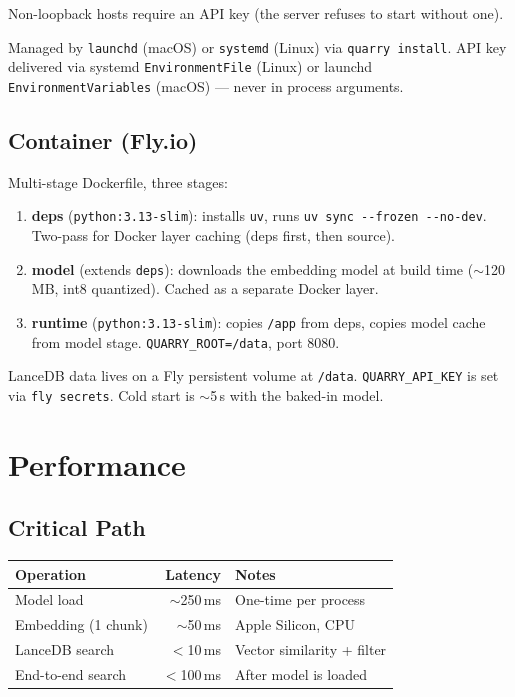 \documentclass[a4paper,10pt]{article}
\begin{document}
Non-loopback hosts require an API key (the server refuses to start
without one).

Managed by \texttt{launchd} (macOS) or \texttt{systemd} (Linux) via
\texttt{quarry install}.  API key delivered via systemd
\texttt{EnvironmentFile} (Linux) or launchd
\texttt{EnvironmentVariables} (macOS) --- never in process arguments.

\subsection{Container (Fly.io)}

Multi-stage Dockerfile, three stages:

\begin{enumerate}
  \item \textbf{deps} (\texttt{python:3.13-slim}): installs
    \texttt{uv}, runs \texttt{uv sync -{}-frozen -{}-no-dev}.  Two-pass
    for Docker layer caching (deps first, then source).
  \item \textbf{model} (extends \texttt{deps}): downloads the
    embedding model at build time ($\sim$120\,MB, int8 quantized).
    Cached as a separate Docker layer.
  \item \textbf{runtime} (\texttt{python:3.13-slim}): copies
    \texttt{/app} from deps, copies model cache from model stage.
    \texttt{QUARRY\_ROOT=/data}, port 8080.
\end{enumerate}

LanceDB data lives on a Fly persistent volume at \texttt{/data}.
\texttt{QUARRY\_API\_KEY} is set via \texttt{fly secrets}.
Cold start is $\sim$5\,s with the baked-in model.

\section{Performance}

\subsection{Critical Path}

\begin{center}
\begin{tabular}{lrl}
\toprule
\textbf{Operation} & \textbf{Latency} & \textbf{Notes} \\
\midrule
Model load         & $\sim$250\,ms & One-time per process \\
Embedding (1 chunk) & $\sim$50\,ms  & Apple Silicon, CPU \\
LanceDB search     & $<$10\,ms     & Vector similarity + filter \\
End-to-end search  & $<$100\,ms    & After model is loaded \\
\bottomrule
\end{tabular}
\end{center}
\end{document}
